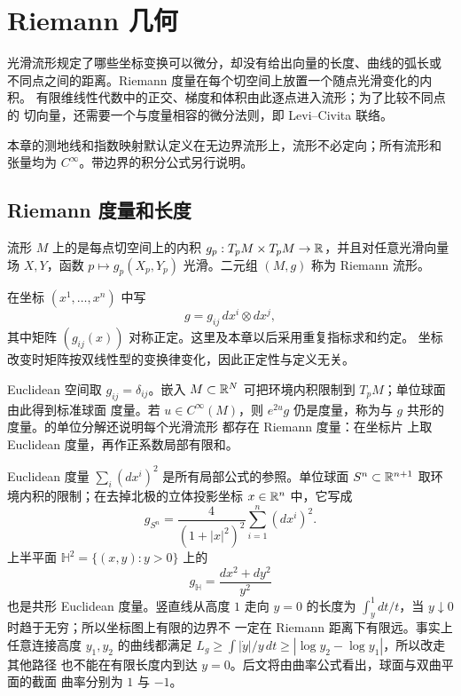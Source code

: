 \chapter{Riemann 几何}
\label{chap:riemannian-geometry}

光滑流形规定了哪些坐标变换可以微分，却没有给出向量的长度、曲线的弧长或
不同点之间的距离。Riemann 度量在每个切空间上放置一个随点光滑变化的内积。
有限维线性代数中的正交、梯度和体积由此逐点进入流形；为了比较不同点的
切向量，还需要一个与度量相容的微分法则，即 Levi--Civita 联络。

本章的测地线和指数映射默认定义在无边界流形上，流形不必定向；所有流形和
张量均为 $C^\infty$。带边界的积分公式另行说明。

\section{Riemann 度量和长度}

\begin{definition}
流形 $M$ 上的是每点切空间上的内积
$g_p:T_pM\times T_pM\to\mathbb{R}$，并且对任意光滑向量场 $X,Y$，函数
$p\mapsto g_p(X_p,Y_p)$ 光滑。二元组 $(M,g)$ 称为 Riemann 流形。
\end{definition}

在坐标 $(x^1,\ldots,x^n)$ 中写
\[
 g=g_{ij}\,dx^i\otimes dx^j,
\]
其中矩阵 $(g_{ij}(x))$ 对称正定。这里及本章以后采用重复指标求和约定。
坐标改变时矩阵按双线性型的变换律变化，因此正定性与定义无关。

Euclidean 空间取 $g_{ij}=\delta_{ij}$。嵌入
$M\subset\mathbb{R}^N$ 可把环境内积限制到 $T_pM$；单位球面由此得到标准球面
度量。若 $u\in C^\infty(M)$，则 $e^{2u}g$ 仍是度量，称为与 $g$ 共形的
度量。的单位分解还说明每个光滑流形
都存在 Riemann 度量：在坐标片
上取 Euclidean 度量，再作正系数局部有限和。

\begin{example}[三个基本度量]
Euclidean 度量 $\sum_i(dx^i)^2$ 是所有局部公式的参照。单位球面
$S^n\subset\mathbb{R}^{n+1}$ 取环境内积的限制；在去掉北极的立体投影坐标
$x\in\mathbb{R}^n$ 中，它写成
\[
 g_{S^n}=\frac{4}{(1+|x|^2)^2}\sum_{i=1}^n(dx^i)^2.
\]
上半平面 $\mathbb H^2=\{(x,y):y>0\}$ 上的
\[
 g_{\mathbb H}=\frac{dx^2+dy^2}{y^2}
\]
也是共形 Euclidean 度量。竖直线从高度 $1$ 走向 $y=0$ 的长度为
$\int_y^1dt/t$，当 $y\downarrow0$ 时趋于无穷；所以坐标图上有限的边界不
一定在 Riemann 距离下有限远。事实上任意连接高度 $y_1,y_2$ 的曲线都满足
$L_g\geq\int|\dot y|/y\,dt\geq|\log y_2-\log y_1|$，所以改走其他路径
也不能在有限长度内到达 $y=0$。后文将由曲率公式看出，球面与双曲平面的截面
曲率分别为 $1$ 与 $-1$。
\end{example}

